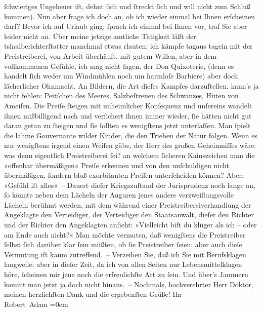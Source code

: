 \begin{ledgroupsized}[t]{13cm}
               ſchwieriges Unge{\pb}heuer iſt, dehnt ſich und ſtreckt
               ſich und will nicht zum Schluß kommen). Nun aber frage ich doch an, ob ich wieder
               einmal bei Ihnen erſcheinen darf? Bevor ich auf Urlaub ging, ſprach ich einmal bei
               Ihnen vor, traf Sie aber leider nicht an.\pend
           \pstart
           Über meine jetzige amtliche Tätigkeit läßt der tsſaalberichterſtatter manchmal etwas rlauten: ich kämpfe tagaus tagein mit der Preistreiberei, von Arbeit
               überhäuft, mit gutem Willen, aber in dem vollkommenen Gefühle, ich mag nicht ſagen,
               der Don Quixoterie,  (denn es handelt ſich weder um Windmühlen noch um
               harmloſe Barbiere) aber doch lächerlicher Ohnmacht. An Bildern, die Art dieſes
               Kampfes darzuſtellen, kann’s ja nicht fehlen: Peitſchen des Meeres, Salzbeſtreuen des
               Schwanzes, Hüten von Ameiſen. Die Preiſe ſteigen mit unheimlicher Konſequenz und
               unſereins wandelt ihnen mißbilligend nach {\pb}und
               verſichert ihnen immer wieder, ſie hätten nicht gut daran getan zu ſteigen und ſie
               ſollten es wenigſtens jetzt unterlaſſen. Man ſpielt die lahme Gouvernante wilder
               Kinder, die den Trieben der Natur folgen. Wenn es nur wenigſtens irgend einen Weiſen
               gäbe, der Herr des großen Geheimniſſes wäre: was denn eigentlich Preistreiberei ſei?
               an welchem ſicheren Kainszeichen man die »offenbar übermäßigen« Preiſe erkennen und
               von den unſchuldigen nicht übermäßigen, ſondern bloß exorbitanten Preiſen
               unterſcheiden können? Aber: »Gefühl iſt alles« –\pend
           \pstart
           Dauert dieſer Kriegszuſtand der Jurisprudenz noch lange an, ſo könnte neben dem
               Lächeln der Auguren jenes andere verzweiflungsvolle Lächeln berühmt werden, mit dem
               während einer Preistreibereiverhandlung der Angeklagte den Verteidiger, der
               Verteidiger den Staatsanwalt, dieſer den Richter und der Richter den Angeklagten
               anſieht: »Vielleicht biſt du {\pb}klüger als ich – oder am
               Ende auch nicht?« Man möchte vermuten, daß wenigſtens die Preistreiber \introOben{}\introOben{}{ }ſelbst \introOben{}ſich\introOben{} darüber klar
               ſein müßten, ob ſie Preistreiber ſeien: aber auch dieſe Vermutung iſt  kaum zutreffend. –\pend
           \pstart
           Verzeihen Sie, daß ich Sie mit Berufsklagen langweile; aber in dieſer Zeit, da ich
               von allen Seiten nur Lebensmittelklagen höre, ſcheinen mir jene noch die
               erfreulichſte Art zu ſein. Und über’s Jammern kommt man jetzt ja doch nicht
               hinaus. –\pend
           \pstart
           Nochmals, hochverehrter Herr Doktor, meinen herzlichſten Dank und die ergebenſten
               Grüße!\pend
           \pstart
           Ihr{\\[\baselineskip]}\spacefill\mbox{Robert Adam}\pend
           \leftskip=0em{}
         

\end{ledgroupsized}
